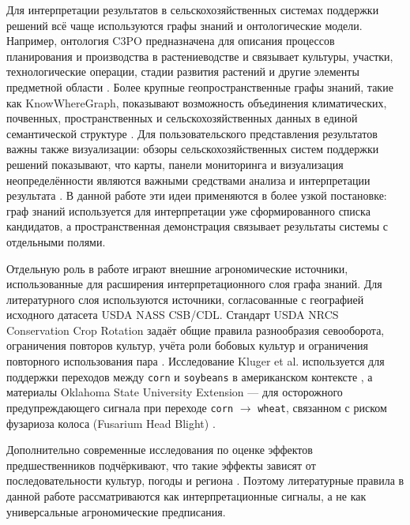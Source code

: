 Для интерпретации результатов в сельскохозяйственных системах поддержки решений всё чаще используются графы знаний и
онтологические модели. Например, онтология C3PO предназначена для описания процессов планирования и производства в
растениеводстве и связывает культуры, участки, технологические операции, стадии развития растений и другие элементы
предметной области \cite{darnala2023c3po}. Более крупные геопространственные графы знаний, такие как KnowWhereGraph,
показывают возможность объединения климатических, почвенных, пространственных и сельскохозяйственных данных в единой
семантической структуре \cite{shimizu2024knowwheregraph}. Для пользовательского представления результатов важны также
визуализации: обзоры сельскохозяйственных систем поддержки решений показывают, что карты, панели мониторинга и
визуализация неопределённости являются важными средствами анализа и интерпретации результата
\cite{gutierrez2019visualisations}. В данной работе эти идеи применяются в более узкой постановке:
граф знаний используется для интерпретации уже сформированного списка кандидатов,
а пространственная демонстрация связывает результаты системы с отдельными полями.

Отдельную роль в работе играют внешние агрономические источники, использованные 
для расширения интерпретационного слоя графа знаний. Для литературного слоя используются источники,
согласованные с географией исходного датасета USDA NASS CSB/CDL. Стандарт USDA NRCS Conservation Crop
Rotation задаёт общие правила разнообразия севооборота, ограничения повторов культур, учёта роли бобовых культур и
ограничения повторного использования пара \cite{nrcs2014conservation_crop_rotation}. Исследование Kluger et al. используется для поддержки
переходов между \texttt{corn} и \texttt{soybeans} в американском контексте \cite{kluger2021rotation_corn_soy}, а
материалы Oklahoma State University Extension --- для осторожного предупреждающего сигнала при переходе
\texttt{corn} $\rightarrow$ \texttt{wheat}, связанном с риском фузариоза колоса (Fusarium Head Blight)
\cite{osu2017corn_residue_wheat_fhb}.

Дополнительно современные исследования по оценке эффектов предшественников подчёркивают, что такие эффекты зависят
от последовательности культур, погоды и региона \cite{kluger2025precrop_effects}. Поэтому литературные правила в
данной работе рассматриваются как интерпретационные сигналы, а не как универсальные агрономические предписания.

